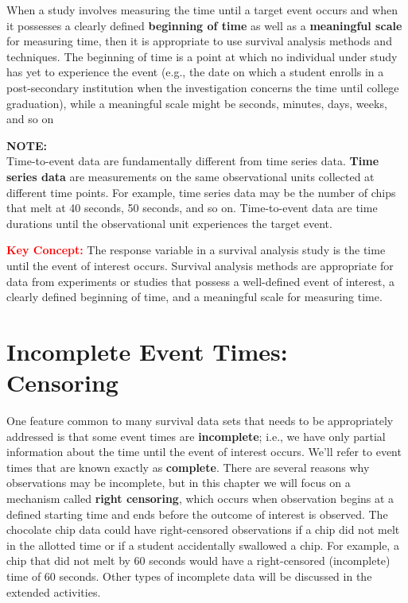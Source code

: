 \documentclass[
]{report}
\begin{document}
When a study involves measuring the time until a target event occurs and when it possesses a clearly
defined \textbf{beginning of time} as well as a \textbf{meaningful scale} for measuring time, then it is appropriate to use
survival analysis methods and techniques. The beginning of time is a point at which no individual under study
has yet to experience the event (e.g., the date on which a student enrolls in a post-secondary institution when
the investigation concerns the time until college graduation), while a meaningful scale might be seconds,
minutes, days, weeks, and so on

\large

\textbf{NOTE:}\\
Time-to-event data are fundamentally different from time series data. \textbf{Time series data} are measurements on the same observational units collected at different time points. For example, time series data may be the number of chips that melt at 40 seconds, 50 seconds, and so on. Time-to-event data are time durations until the observational unit experiences the target event.\\
\normalsize

\large

\textbf{\textcolor{red}{Key Concept:}}
\color{red}
The response variable in a survival analysis study is the time until the event of interest occurs. Survival analysis methods are appropriate for data from experiments or studies that possess a well-defined event of interest, a clearly defined beginning of time, and a meaningful scale for measuring time.\\
\color{black}
\normalsize

\section*{Incomplete Event Times: Censoring}\label{incomplete-event-times-censoring}

One feature common to many survival data sets that needs to be appropriately addressed is that some event times are \textbf{incomplete}; i.e., we have only partial information about the time until the event of interest occurs. We'll refer to event times that are known exactly as \textbf{complete}. There are several reasons why observations may be incomplete, but in this chapter we will focus on a mechanism called \textbf{right censoring}, which occurs when observation begins at a defined starting time and ends before the outcome of interest is observed. The chocolate chip data could have right-censored observations if a chip did not melt in the allotted time or if a student accidentally swallowed a chip. For example, a chip that did not melt by 60 seconds would have a right-censored (incomplete) time of 60 seconds. Other types of incomplete data will be discussed in the extended activities.
\end{document}
